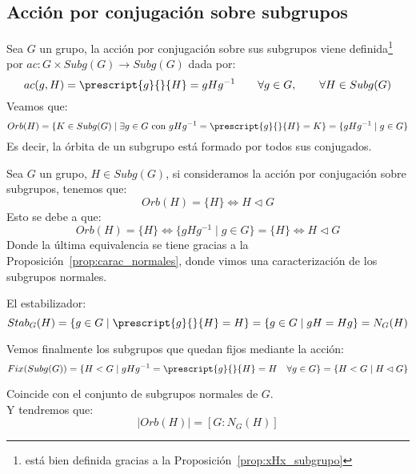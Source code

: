 \subsection{Acción por conjugación sobre subgrupos}
\noindent
Sea $G$ un grupo, la acción por conjugación sobre sus subgrupos viene definida\footnote{está bien definida gracias a la Proposición~\ref{prop:xHx_subgrupo}} por $ac:G\times Subg(G)\to Subg(G)$ dada por:
\begin{equation*}
    ac(g,H) = \prescript{g}{}{H} = gHg^{-1} \qquad \forall g\in G, \qquad \forall H\in Subg(G)
\end{equation*}
Veamos que:
\begin{equation*}
    Orb(H) = \{K\in Subg(G) \mid \exists g\in G \text{\ con\ } gHg^{-1} = \prescript{g}{}{H} = K \} = \{gHg^{-1} \mid g\in G\}
\end{equation*}
Es decir, la órbita de un subgrupo está formado por todos sus conjugados.

\begin{observacion}
    Sea $G$ un grupo, $H\in Subg(G)$, si consideramos la acción por conjugación sobre subgrupos, tenemos que:
    \begin{equation*}
        Orb(H) = \{H\} \Longleftrightarrow H\lhd G
    \end{equation*}
    Esto se debe a que:
    \begin{equation*}
        Orb(H) = \{H\} \Longleftrightarrow \{gHg^{-1}\mid g\in G\} = \{H\} \Longleftrightarrow H \lhd G
    \end{equation*}
    Donde la última equivalencia se tiene gracias a la Proposición~\ref{prop:carac_normales}, donde vimos una caracterización de los subgrupos normales.
\end{observacion}
El estabilizador:
\begin{equation*}
    Stab_G(H) = \{g\in G \mid \prescript{g}{}{H} = H\} = \{g\in G \mid gH = Hg\} = N_G(H)
\end{equation*}

Vemos finalmente los subgrupos que quedan fijos mediante la acción:
\begin{equation*}
    Fix(Subg(G)) = \{H < G \mid gHg^{-1} = \prescript{g}{}{H} = H \quad \forall g\in G\} = \{H< G \mid H\lhd G\}
\end{equation*}

Coincide con el conjunto de subgrupos normales de $G$.\\

\noindent
Y tendremos que:
\begin{equation*}
    |Orb(H)| = [G:N_G(H)]
\end{equation*}

